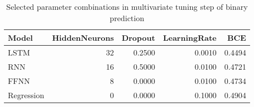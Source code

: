 \begin{table}[h!]
\centering
 \begin{adjustbox}{max width=\textwidth}
\begin{tabular}{lrrrr}
  \hline
Model & HiddenNeurons & Dropout & LearningRate & BCE \\ 
  \hline
LSTM &    32 & 0.2500 & 0.0010 & 0.4494 \\ 
  RNN &    16 & 0.5000 & 0.0100 & 0.4721 \\ 
  FFNN &     8 & 0.0000 & 0.0100 & 0.4734 \\ 
  Regression &     0 & 0.0000 & 0.1000 & 0.4904 \\ 
   \hline
 \end{tabular}
\end{adjustbox}
\caption{Selected parameter combinations in multivariate tuning step of binary prediction} 
\label{tab:binary.multivar.par.tuning.short}
\end{table}


